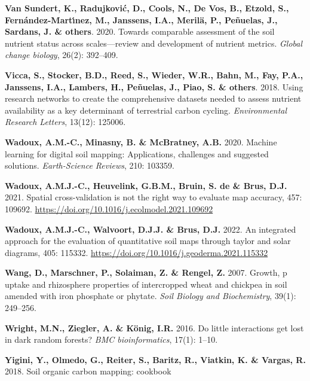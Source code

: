 \documentclass[
  10pt,
  b5paper,
  oneside]{book}
\newlength{\cslhangindent}
\newlength{\cslentryspacingunit} %
\newenvironment{CSLReferences}[2] %
 {%
  \setlength{\parindent}{0pt}
  \ifodd #1
  \let\oldpar\par
  \def\par{\hangindent=\cslhangindent\oldpar}
  \fi
  \setlength{\parskip}{#2\cslentryspacingunit}
 }%
 {}
\begin{document}
\begin{CSLReferences}{0}{0}
\leavevmode{}%
\textbf{Van Sundert, K., Radujković, D., Cools, N., De Vos, B., Etzold, S., Fernández-Martı́nez, M., Janssens, I.A., Merilä, P., Peñuelas, J., Sardans, J. \& others}. 2020. Towards comparable assessment of the soil nutrient status across scales---review and development of nutrient metrics. \emph{Global change biology}, 26(2): 392--409.

\leavevmode{}%
\textbf{Vicca, S., Stocker, B.D., Reed, S., Wieder, W.R., Bahn, M., Fay, P.A., Janssens, I.A., Lambers, H., Peñuelas, J., Piao, S. \& others}. 2018. Using research networks to create the comprehensive datasets needed to assess nutrient availability as a key determinant of terrestrial carbon cycling. \emph{Environmental Research Letters}, 13(12): 125006.

\leavevmode{}%
\textbf{Wadoux, A.M.-C., Minasny, B. \& McBratney, A.B.} 2020. Machine learning for digital soil mapping: Applications, challenges and suggested solutions. \emph{Earth-Science Reviews}, 210: 103359.

\leavevmode{}%
\textbf{Wadoux, A.M.J.-C., Heuvelink, G.B.M., Bruin, S. de \& Brus, D.J.} 2021. Spatial cross-validation is not the right way to evaluate map accuracy, 457: 109692. \url{https://doi.org/10.1016/j.ecolmodel.2021.109692}

\leavevmode{}%
\textbf{Wadoux, A.M.J.-C., Walvoort, D.J.J. \& Brus, D.J.} 2022. An integrated approach for the evaluation of quantitative soil maps through taylor and solar diagrams, 405: 115332. \url{https://doi.org/10.1016/j.geoderma.2021.115332}

\leavevmode{}%
\textbf{Wang, D., Marschner, P., Solaiman, Z. \& Rengel, Z.} 2007. Growth, p uptake and rhizosphere properties of intercropped wheat and chickpea in soil amended with iron phosphate or phytate. \emph{Soil Biology and Biochemistry}, 39(1): 249--256.

\leavevmode{}%
\textbf{Wright, M.N., Ziegler, A. \& König, I.R.} 2016. Do little interactions get lost in dark random forests? \emph{BMC bioinformatics}, 17(1): 1--10.

\leavevmode{}%
\textbf{Yigini, Y., Olmedo, G., Reiter, S., Baritz, R., Viatkin, K. \& Vargas, R.} 2018. Soil organic carbon mapping: cookbook

\end{CSLReferences}


\end{document}
